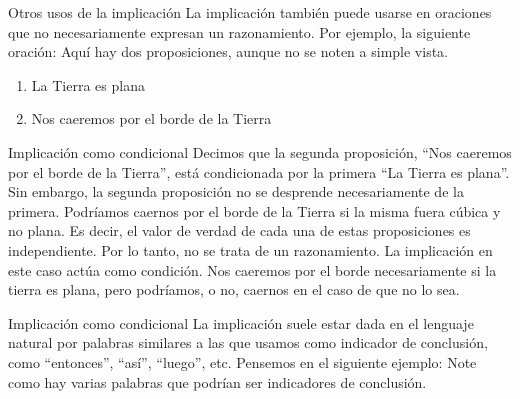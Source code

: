 
\begin{frame}{Otros usos de la implicación}
  La implicación también puede usarse en oraciones que no necesariamente
  expresan un razonamiento.
  \jump
  Por ejemplo, la siguiente oración:
  \jump
  \jump
  Aquí hay dos proposiciones, aunque no se noten a simple vista.
  \begin{enumerate}
    \item La Tierra es plana
    \item Nos caeremos por el borde de la Tierra
  \end{enumerate}
\end{frame}


\begin{frame}{Implicación como condicional}
  Decimos que la segunda proposición, ``Nos caeremos por el borde de la Tierra'',
  está condicionada por la primera ``La Tierra es plana''.
  \jump
  Sin embargo, la segunda proposición no se desprende necesariamente de la
  primera. Podríamos caernos por el borde de la Tierra si la misma fuera cúbica
  y no plana.
  \jump
  Es decir, el valor de verdad de cada una de estas proposiciones es
  independiente. Por lo tanto, no se trata de un razonamiento.
  \jump
  La implicación en este caso actúa como condición. Nos caeremos por el borde
  necesariamente si la tierra es plana, pero podríamos, o no, caernos en el caso
  de que no lo sea.
\end{frame}


\begin{frame}{Implicación como condicional}
  La implicación suele estar dada en el lenguaje natural por palabras similares
  a las que usamos como indicador de conclusión, como ``entonces'', ``así'',
  ``luego'', etc.
  \jump
  Pensemos en el siguiente ejemplo:
  \jump
  \jump
  Note como hay varias palabras que podrían ser indicadores de conclusión.
\end{frame}


